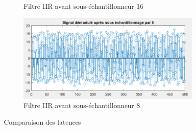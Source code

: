 \documentclass[
10pt,
aspectratio=169,
]{beamer}
\begin{document}
\begin{frame}
\begin{figure}
\begin{subfigure}{0.4\textwidth}
    \caption{Filtre IIR avant sous-échantillonneur 16}
\end{subfigure}
\begin{subfigure}{0.4\textwidth}
    \includegraphics[scale=0.3]{Images/lat_IIR_8.PNG}
    \caption{Filtre IIR avant sous-échantillonneur 8}
\end{subfigure}
        
\caption{Comparaison des latences}
\end{figure}
\end{frame}

\end{document}
